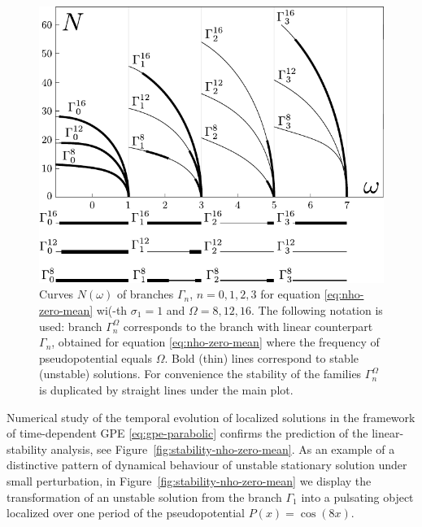 \begin{figure}[h]
\centering
	\includegraphics[scale = 1]{pic/branches with linear counterpart, zero mean cosine nho}
	\caption{
		Curves $N(\omega)$ of branches $\Gamma_n$, $n = 0, 1, 2, 3$ for equation \eqref{eq:nho-zero-mean} wi(-th $\sigma_1 = 1$ and $\Omega = 8, 12, 16$.
		The following notation is used: branch $\Gamma_n^{\Omega}$ corresponds to the branch with linear counterpart $\Gamma_n$, obtained for equation \eqref{eq:nho-zero-mean} where the frequency of pseudopotential equals $\Omega$.
		Bold (thin) lines correspond to stable (unstable) solutions.
		For convenience the stability of the families $\Gamma_n^{\Omega}$ is duplicated by straight lines under the main plot.
	}
\label{fig:branches-with-linear-counterpart-zero-mean}
\end{figure}

Numerical study of the temporal evolution of localized solutions in the framework of time-dependent GPE \eqref{eq:gpe-parabolic} confirms the prediction of the linear-stability analysis, see Figure~\ref{fig:stability-nho-zero-mean}.
As an example of a distinctive pattern of dynamical behaviour of unstable stationary solution under small perturbation, in Figure~\ref{fig:stability-nho-zero-mean} we display the transformation of an unstable solution from the branch $\Gamma_1$ into a pulsating object localized over one period of the pseudopotential $P(x) = \cos (8x)$.

